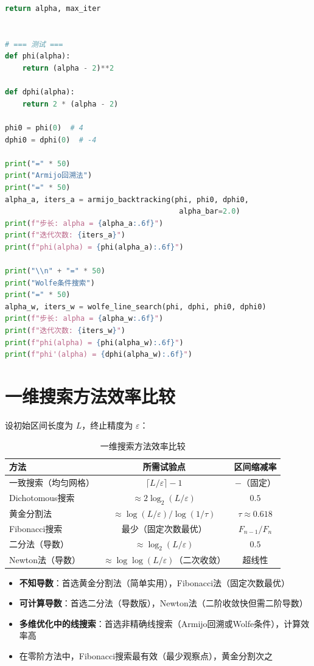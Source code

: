 \begin{lstlisting}[language=Python, caption=不精确搜索条件实现]
    return alpha, max_iter


# === 测试 ===
def phi(alpha):
    return (alpha - 2)**2

def dphi(alpha):
    return 2 * (alpha - 2)

phi0 = phi(0)  # 4
dphi0 = dphi(0)  # -4

print("=" * 50)
print("Armijo回溯法")
print("=" * 50)
alpha_a, iters_a = armijo_backtracking(phi, phi0, dphi0, 
                                        alpha_bar=2.0)
print(f"步长: alpha = {alpha_a:.6f}")
print(f"迭代次数: {iters_a}")
print(f"phi(alpha) = {phi(alpha_a):.6f}")

print("\\n" + "=" * 50)
print("Wolfe条件搜索")
print("=" * 50)
alpha_w, iters_w = wolfe_line_search(phi, dphi, phi0, dphi0)
print(f"步长: alpha = {alpha_w:.6f}")
print(f"迭代次数: {iters_w}")
print(f"phi(alpha) = {phi(alpha_w):.6f}")
print(f"phi'(alpha) = {dphi(alpha_w):.6f}")
\end{lstlisting}

\section{一维搜索方法效率比较}\label{sec:efficiency-compare}

设初始区间长度为 $L$，终止精度为 $\varepsilon$：

\begin{table}[H]
\centering
\caption{一维搜索方法效率比较}
\begin{tabular}{@{}lcc@{}}
\toprule
\textbf{方法} & \textbf{所需试验点} & \textbf{区间缩减率} \\
\midrule
一致搜索（均匀网格） & $\lceil L/\varepsilon \rceil - 1$ & $-\text{（固定）}$ \\
Dichotomous搜索 & $\approx 2\log_2(L/\varepsilon)$ & $0.5$ \\
黄金分割法 & $\approx \log(L/\varepsilon) / \log(1/\tau)$ & $\tau \approx 0.618$ \\
Fibonacci搜索 & 最少（固定次数最优） & $F_{n-1}/F_n$ \\
二分法（导数） & $\approx \log_2(L/\varepsilon)$ & $0.5$ \\
Newton法（导数） & $\approx \log\log(L/\varepsilon)$（二次收敛） & 超线性 \\
\bottomrule
\end{tabular}
\end{table}

\begin{notebox}[方法选择建议]
\begin{itemize}[itemsep=0.3em]
    \item \textbf{不知导数}：首选黄金分割法（简单实用），Fibonacci法（固定次数最优）
    \item \textbf{可计算导数}：首选二分法（导数版），Newton法（二阶收敛快但需二阶导数）
    \item \textbf{多维优化中的线搜索}：首选非精确线搜索（Armijo回溯或Wolfe条件），计算效率高
    \item 在零阶方法中，Fibonacci搜索最有效（最少观察点），黄金分割次之
\end{itemize}
\end{notebox}

